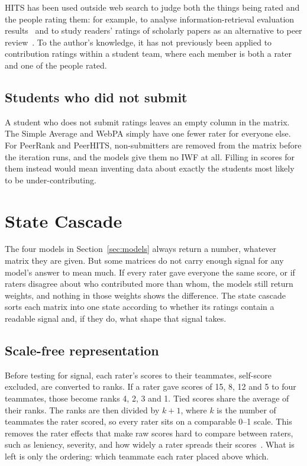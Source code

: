HITS has been used outside web search to judge both the things being rated and
the people rating them: for example, to analyse information-retrieval evaluation
results~\citep{mizzaro2007hits} and to study readers' ratings of scholarly papers
as an alternative to peer review~\citep{soprano2019hits}. To the author's
knowledge, it has not previously been applied to contribution ratings within a
student team, where each member is both a rater and one of the people rated.

\subsection{Students who did not submit}
\label{sec:non-submitters}

A student who does not submit ratings leaves an empty column in the matrix. The
Simple Average and WebPA simply have one fewer rater for everyone else. For
PeerRank and PeerHITS, non-submitters are removed from the matrix before the
iteration runs, and the models give them no IWF at all. Filling in scores for
them instead would mean inventing data about exactly the students most likely
to be under-contributing. 


\section{State Cascade}
\label{sec:cascade}

The four models in Section~\ref{sec:models} always return a number, whatever
matrix they are given. But some matrices do not carry enough signal for any
model's answer to mean much. If every rater gave everyone the same score, or if
raters disagree about who contributed more than whom, the models still return
weights, and nothing in those weights shows the difference. The state cascade
sorts each matrix into one state according to whether its ratings contain a
readable signal and, if they do, what shape that signal takes.

\subsection{Scale-free representation}
\label{sec:rank-transform}

Before testing for signal, each rater's scores to their teammates, self-score
excluded, are converted to ranks. If a rater gave scores of 15, 8, 12 and 5 to
four teammates, those become ranks 4, 2, 3 and 1. Tied scores share the average
of their ranks. The ranks are then divided by $k{+}1$, where $k$ is the number
of teammates the rater scored, so every rater sits on a comparable 0--1 scale.
This removes the rater effects that make raw scores hard to compare between
raters, such as leniency, severity, and how widely a rater spreads their
scores~\citep{linacre1989mfrm}. What is left is only the ordering: which
teammate each rater placed above which.


